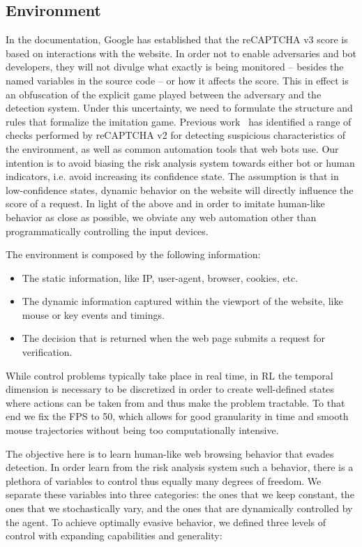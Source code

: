 \subsection{Environment}

In the documentation, Google has established that the reCAPTCHA v3 score is based on interactions with the website.
In order not to enable adversaries and bot developers, they will not divulge what exactly is being monitored -- besides the named variables in the source code -- or how it affects the score.
This in effect is an obfuscation of the explicit game played between the adversary and the detection system.
Under this uncertainty, we need to formulate the structure and rules that formalize the imitation game.
Previous work~\cite{sivakorn2016robot, li2021good} has identified a range of checks performed by reCAPTCHA v2 for detecting suspicious characteristics of the environment, as well as common automation tools that web bots use.
Our intention is to avoid biasing the risk analysis system towards either bot or human indicators, i.e. avoid increasing its confidence state.
The assumption is that in low-confidence states, dynamic behavior on the website will directly influence the score of a request. 
In light of the above and in order to imitate human-like behavior as close as possible, we obviate any web automation other than programmatically controlling the input devices.

The environment is composed by the following information:
\begin{itemize}
  \item The static information, like IP, user-agent, browser, cookies, etc.
  \item The dynamic information captured within the viewport of the website, like mouse or key events and timings.
  \item The decision that is returned when the web page submits a request for verification.
 \end{itemize}

While control problems typically take place in real time, in \gls{RL} the temporal dimension is necessary to be discretized in order to create well-defined states where actions can be taken from and thus make the problem tractable.
To that end we fix the \gls{FPS} to 50, which allows for good granularity in time and smooth mouse trajectories without being too computationally intensive.

The objective here is to learn human-like web browsing behavior that evades detection.
In order learn from the risk analysis system such a behavior, there is a plethora of variables to control thus equally many degrees of freedom.
We separate these variables into three categories: the ones that we keep constant, the ones that we stochastically vary, and the ones that are dynamically controlled by the agent.
To achieve optimally evasive behavior, we defined three levels of control with expanding capabilities and generality:

